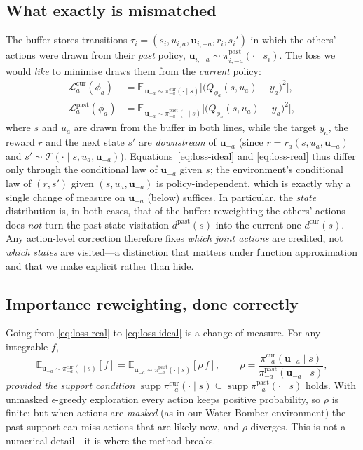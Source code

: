 \documentclass[sigconf]{aamas}
\newcommand{\uma}{\mathbf{u}_{-a}}
\newcommand{\umai}{\mathbf{u}_{i,-a}}
\newcommand{\picur}{\pi^{\mathrm{cur}}_{-a}}
\newcommand{\pipast}{\pi^{\mathrm{past}}_{-a}}
\newcommand{\pipasti}{\pi^{\mathrm{past}}_{i,-a}}
\DeclareMathOperator{\supp}{supp}
\begin{document}
\subsection{What exactly is mismatched}
The buffer stores transitions $\tau_i=(s_i,u_{i,a},\umai,r_i,s_i')$ in which the
others' actions were drawn from their \emph{past} policy,
$\umai\sim\pipasti(\cdot\mid s_i)$. The loss we would \emph{like} to minimise
draws them from the \emph{current} policy:
\begin{align}
\label{eq:loss-ideal}
\mathcal{L}^{\mathrm{cur}}_a(\phi_a)&=
\mathbb{E}_{\,\uma\sim\picur(\cdot\mid s)}\Big[\big(Q_{\phi_a}(s,u_a)-y_a\big)^2\Big],\\
\label{eq:loss-real}
\mathcal{L}^{\mathrm{past}}_a(\phi_a)&=
\mathbb{E}_{\,\uma\sim\pipast(\cdot\mid s)}\Big[\big(Q_{\phi_a}(s,u_a)-y_a\big)^2\Big],
\end{align}
where $s$ and $u_a$ are drawn from the buffer in both lines, while the target
$y_a$, the reward $r$ and the next state $s'$ are \emph{downstream} of $\uma$
(since $r=r_a(s,u_a,\uma)$ and $s'\sim\mathcal{T}(\cdot\mid s,u_a,\uma)$).
Equations~\eqref{eq:loss-ideal} and \eqref{eq:loss-real} thus differ only through
the conditional law of $\uma$ given $s$; the environment's conditional law of
$(r,s')$ given $(s,u_a,\uma)$ is policy-independent, which is exactly why a single
change of measure on $\uma$ (below) suffices. In particular, the \emph{state}
distribution is, in both cases, that of the
buffer: reweighting the others' actions does \emph{not} turn the past
state-visitation $d^{\mathrm{past}}(s)$ into the current one
$d^{\mathrm{cur}}(s)$. Any action-level correction therefore fixes
\emph{which joint actions} are credited, not \emph{which states} are visited---a
distinction that matters under function approximation and that we make explicit
rather than hide.

\subsection{Importance reweighting, done correctly}
\label{sec:ratio}
Going from \eqref{eq:loss-real} to \eqref{eq:loss-ideal} is a change of measure.
For any integrable $f$,
\begin{equation}
\label{eq:is}
\mathbb{E}_{\uma\sim\picur(\cdot\mid s)}[f]=
\mathbb{E}_{\uma\sim\pipast(\cdot\mid s)}\!\left[\rho\,f\right],
\qquad
\rho=\frac{\picur(\uma\mid s)}{\pipast(\uma\mid s)},
\end{equation}
\emph{provided the support condition}
$\supp\picur(\cdot\mid s)\subseteq\supp\pipast(\cdot\mid s)$ holds. With
unmasked $\epsilon$-greedy exploration every action keeps positive probability,
so $\rho$ is finite; but when actions are \emph{masked} (as in our Water-Bomber
environment) the past support can miss actions that are likely now, and $\rho$
diverges. This is not a numerical detail---it is where the method breaks.
\end{document}
